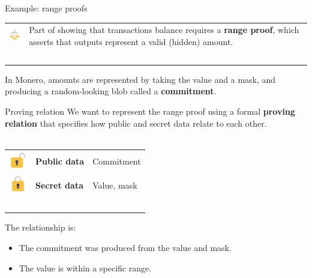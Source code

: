\documentclass[aspectratio=169]{beamer}
\begin{document}
\begin{frame}{Example: range proofs}
    \begin{tabular}{>{\arraybackslash}m{40px} >{\arraybackslash}m{320px}}
        \includegraphics[width=30px]{images/balance.png} & Part of showing that transactions balance requires a \textbf{range proof}, which asserts that outputs represent a valid (hidden) amount. \\~\\
    \end{tabular}

    In Monero, amounts are represented by taking the value and a mask, and producing a random-looking blob called a \textbf{commitment}.

    \begin{figure}
    \end{figure}
\end{frame}

\begin{frame}{Proving relation}
    We want to represent the range proof using a formal \textbf{proving relation} that specifies how public and secret data relate to each other. \\~\\

    \begin{tabular}{>{\arraybackslash}m{40px} >{\arraybackslash}m{100px} >{\arraybackslash}m{220px}}
        \includegraphics[width=30px]{images/unlock.png} & \textbf{Public data} & Commitment \\
        \includegraphics[width=30px]{images/lock.png} & \textbf{Secret data} & Value, mask \\~\\
    \end{tabular}

    The relationship is:
    \begin{itemize}
        \item The commitment was produced from the value and mask.
        \item The value is within a specific range.
    \end{itemize}
\end{frame}
\end{document}

